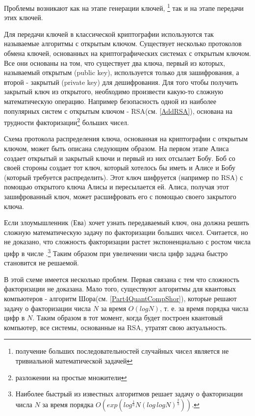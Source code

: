Проблемы возникают как на этапе генерации ключей, \footnote{получение больших
последовательностей случайных чисел является не тривиальной
математической задачей} так и на этапе передачи этих ключей. 

Для передачи ключей в классической криптографии используются так
называемые алгоритмы с открытым ключом. Существует несколько
протоколов обмена ключей, основанных на криптографических системах с
открытым ключом. Все они основаны на том, что существует два ключа,
первый из которых, называемый открытым (public key), используется только
для зашифрования, а второй - закрытый (private key) для дешифрования. 
Для того чтобы получить закрытый ключ из открытого,
необходимо произвести какую-то сложную математическую
операцию. Например безопасность одной из наиболее популярных систем с
открытым ключом - RSA(см. \ref {AddRSA}), основана на трудности
факторизации\footnote{разложении на простые множители} больших чисел.

Схема протокола распределения ключа, основанная на криптографии с
открытым ключом, может быть описана следующим образом. На первом этапе
Алиса создает открытый и закрытый ключи и первый из них отсылает Бобу. 
Боб со своей стороны создает тот ключ, который хотелось бы иметь и
Алисе и Бобу (который требуется распределить). Этот ключ шифруется
(например по RSA) с помощью открытого ключа Алисы и пересылается
ей. Алиса, получая этот зашифрованный ключ, может расшифровать его с
помощью своего закрытого ключа.

Если злоумышленник (Ева) хочет узнать передаваемый ключ, она должна
решить сложную математическую задачу по факторизации больших
чисел. Считается, но не доказано, что сложность факторизации растет
экспоненциально с ростом числа цифр в числе
\cite{bPhisQuantInfo}.\footnote{Наиболее быстрый из известных
  алгоритмов решает задачу о факторизации числа $N$ за время порядка
  $O\left(exp\left(log^{\frac{1}{3}}N\left(log \, log N\right)^{\frac{2}{3}}\right)\right)$.} 
Таким образом при увеличении числа цифр задача быстро становится не решаемой.

В этой схеме имеется несколько проблем. Первая связана с тем что
сложность факторизации не доказана. Мало того, существуют алгоритмы для
квантовых компьютеров - алгоритм Шора(см. \ref {Part4QuantCompShor}),
которые решают задачу о факторизации числа $N$ за время $O\left(log
N\right)$, т. е. за время порядка числа цифр в $N$. Таким образом в
тот момент, когда будет построен квантовый компьютер, все системы,
основанные на RSA, утратят свою актуальность. 

